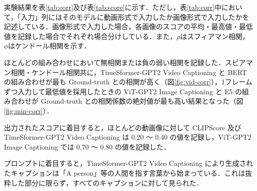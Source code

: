 \documentclass[11pt,a4j]{jreport}
\begin{document}

実験結果を表\ref{tab:corr}及び表\ref{tab:score}に示す．ただし，表\ref{tab:corr}中において，「入力」列にはそのモデルに動画形式で入力したか画像形式で入力したかを記述している．画像形式で入力した場合，各画像のスコアの平均・最高値・最低値を記録した場合でそれぞれ場合分けしている．また，$\rho$はスフィアマン相関，$\phi$はケンドール相関を示す．

ほとんどの組み合わせにおいて無相関または負の弱い相関を記録した．スピアマン相関・ケンドール相関共に，TimeSformer-GPT2 Video Captioning \cite{tsf+gpt2} と BERT \cite{devlin2018bert} の組み合わせが最も Ground-truth との相関が高く（図\ref{fig:vid-corr}），1フレームずつ入力して最低値を採用したときの ViT-GPT2 Image Captioning \cite{vit+gpt2} と E5 \cite{wang2022e5} の組み合わせが Ground-truth との相関係数の絶対値が最も高い結果となった（図\ref{fig:min-corr}）．

出力されたスコアに着目すると，ほとんどの動画像に対して CLIPScore \cite{hessel2021clipscore} 及び TimeSformer-GPT2 Video Captioning は 0.20 ～ 0.40 の値を記録し，ViT-GPT2 Image Captioning では 0.70 ～ 0.80 の値を記録した．

プロンプトに着目すると，TimeSformer-GPT2 Video Captioning により生成されたキャプションは「A person」等の人間を指す言葉から始まっている．これは抜粋した部分に限らず，すべてのキャプションに対して見られた．

\end{document}
